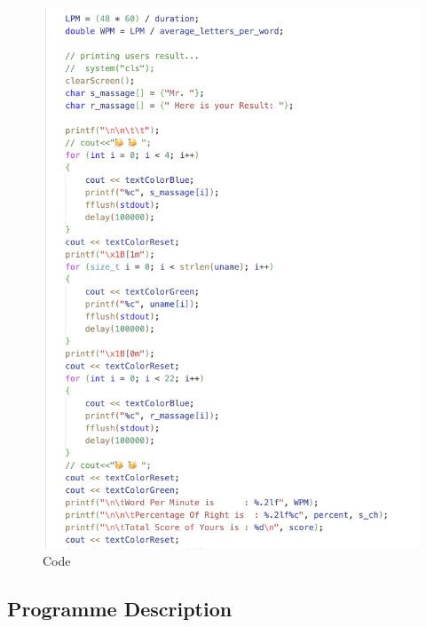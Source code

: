 \begin{figure}[h]
     \includegraphics[scale=0.20]{CodeScreenShot/calcu-2.png}
    \caption{Code}
    \label{fig:code-screenshots}
\end{figure}

\subsection{Programme Description}

